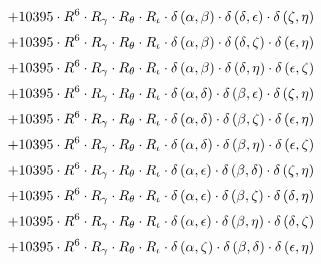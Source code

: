 \begin{subequations}
\begin{gather}
 \\[0.2em] \notag 		 + 10395 \cdot R^{6} \cdot R_{\gamma{}} \cdot R_{\theta{}} \cdot R_{\iota{}} \cdot \delta{}\left(\alpha{}, \beta{}\right) \cdot \delta{}\left(\delta{}, \epsilon{}\right) \cdot \delta{}\left(\zeta{}, \eta{}\right) 
 \\[0.2em] \notag 		 + 10395 \cdot R^{6} \cdot R_{\gamma{}} \cdot R_{\theta{}} \cdot R_{\iota{}} \cdot \delta{}\left(\alpha{}, \beta{}\right) \cdot \delta{}\left(\delta{}, \zeta{}\right) \cdot \delta{}\left(\epsilon{}, \eta{}\right) 
 \\[0.2em] \notag 		 + 10395 \cdot R^{6} \cdot R_{\gamma{}} \cdot R_{\theta{}} \cdot R_{\iota{}} \cdot \delta{}\left(\alpha{}, \beta{}\right) \cdot \delta{}\left(\delta{}, \eta{}\right) \cdot \delta{}\left(\epsilon{}, \zeta{}\right) 
 \\[0.2em] \notag 		 + 10395 \cdot R^{6} \cdot R_{\gamma{}} \cdot R_{\theta{}} \cdot R_{\iota{}} \cdot \delta{}\left(\alpha{}, \delta{}\right) \cdot \delta{}\left(\beta{}, \epsilon{}\right) \cdot \delta{}\left(\zeta{}, \eta{}\right) 
 \\[0.2em] \notag 		 + 10395 \cdot R^{6} \cdot R_{\gamma{}} \cdot R_{\theta{}} \cdot R_{\iota{}} \cdot \delta{}\left(\alpha{}, \delta{}\right) \cdot \delta{}\left(\beta{}, \zeta{}\right) \cdot \delta{}\left(\epsilon{}, \eta{}\right) 
 \\[0.2em] \notag 		 + 10395 \cdot R^{6} \cdot R_{\gamma{}} \cdot R_{\theta{}} \cdot R_{\iota{}} \cdot \delta{}\left(\alpha{}, \delta{}\right) \cdot \delta{}\left(\beta{}, \eta{}\right) \cdot \delta{}\left(\epsilon{}, \zeta{}\right) 
 \\[0.2em] \notag 		 + 10395 \cdot R^{6} \cdot R_{\gamma{}} \cdot R_{\theta{}} \cdot R_{\iota{}} \cdot \delta{}\left(\alpha{}, \epsilon{}\right) \cdot \delta{}\left(\beta{}, \delta{}\right) \cdot \delta{}\left(\zeta{}, \eta{}\right) 
 \\[0.2em] \notag 		 + 10395 \cdot R^{6} \cdot R_{\gamma{}} \cdot R_{\theta{}} \cdot R_{\iota{}} \cdot \delta{}\left(\alpha{}, \epsilon{}\right) \cdot \delta{}\left(\beta{}, \zeta{}\right) \cdot \delta{}\left(\delta{}, \eta{}\right) 
 \\[0.2em] \notag 		 + 10395 \cdot R^{6} \cdot R_{\gamma{}} \cdot R_{\theta{}} \cdot R_{\iota{}} \cdot \delta{}\left(\alpha{}, \epsilon{}\right) \cdot \delta{}\left(\beta{}, \eta{}\right) \cdot \delta{}\left(\delta{}, \zeta{}\right) 
 \\[0.2em] \notag 		 + 10395 \cdot R^{6} \cdot R_{\gamma{}} \cdot R_{\theta{}} \cdot R_{\iota{}} \cdot \delta{}\left(\alpha{}, \zeta{}\right) \cdot \delta{}\left(\beta{}, \delta{}\right) \cdot \delta{}\left(\epsilon{}, \eta{}\right) 

\end{gather}
\end{subequations}
